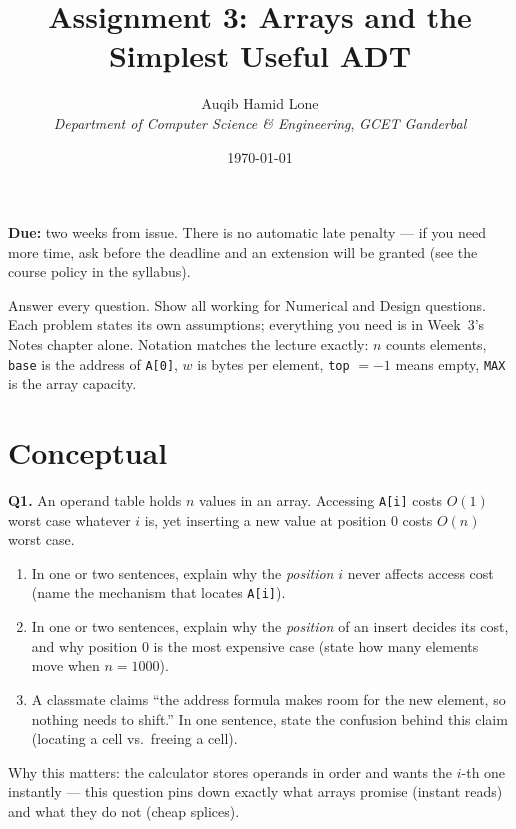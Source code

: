 \documentclass[11pt]{article}
\title{Assignment 3: Arrays and the Simplest Useful ADT}
\author{Auqib Hamid Lone\\[0.3em]
  \emph{Department of Computer Science \& Engineering}, \emph{GCET Ganderbal}}
\date{\today}
\begin{document}
\maketitle

\noindent\textbf{Due:} two weeks from issue. There is no automatic late penalty --- if you need more time, ask before the deadline and an extension will be granted (see the course policy in the syllabus).

\noindent Answer every question. Show all working for Numerical and Design questions. Each problem states its own assumptions; everything you need is in Week~3's Notes chapter alone. Notation matches the lecture exactly: $n$ counts elements, \texttt{base} is the address of \texttt{A[0]}, $w$ is bytes per element, \texttt{top} $= -1$ means empty, \texttt{MAX} is the array capacity.

\section{Conceptual}

\textbf{Q1.} An operand table holds $n$ values in an array. Accessing \texttt{A[i]} costs $O(1)$ worst case whatever $i$ is, yet inserting a new value at position $0$ costs $O(n)$ worst case.
\begin{enumerate}
  \item[(a)] In one or two sentences, explain why the \emph{position} $i$ never affects access cost (name the mechanism that locates \texttt{A[i]}).
  \item[(b)] In one or two sentences, explain why the \emph{position} of an insert decides its cost, and why position $0$ is the most expensive case (state how many elements move when $n = 1000$).
  \item[(c)] A classmate claims ``the address formula makes room for the new element, so nothing needs to shift.'' In one sentence, state the confusion behind this claim (locating a cell vs.\ freeing a cell).
\end{enumerate}
Why this matters: the calculator stores operands in order and wants the $i$-th one instantly --- this question pins down exactly what arrays promise (instant reads) and what they do not (cheap splices).
\end{document}
